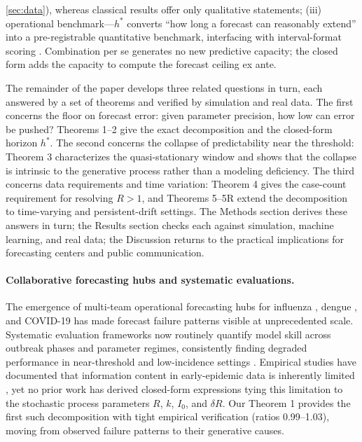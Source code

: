 \documentclass[review]{elsarticle}
\theoremstyle{plain}
\theoremstyle{definition}
\begin{document}
\ref{sec:data}), whereas classical results offer only qualitative statements; (iii) operational benchmark---$h^*$ converts ``how long a forecast can reasonably extend'' into a pre-registrable quantitative benchmark, interfacing with interval-format scoring \citep{bracher2021evaluating}. Combination per se generates no new predictive capacity; the closed form adds the capacity to compute the forecast ceiling ex ante.

The remainder of the paper develops three related questions in turn, each answered by a set of theorems and verified by simulation and real data. The first concerns the floor on forecast error: given parameter precision, how low can error be pushed? Theorems 1--2 give the exact decomposition and the closed-form horizon $h^*$. The second concerns the collapse of predictability near the threshold: Theorem 3 characterizes the quasi-stationary window and shows that the collapse is intrinsic to the generative process rather than a modeling deficiency. The third concerns data requirements and time variation: Theorem 4 gives the case-count requirement for resolving $R>1$, and Theorems 5--5R extend the decomposition to time-varying and persistent-drift settings. The Methods section derives these answers in turn; the Results section checks each against simulation, machine learning, and real data; the Discussion returns to the practical implications for forecasting centers and public communication.

\paragraph{Collaborative forecasting hubs and systematic evaluations.}
The emergence of multi-team operational forecasting hubs for influenza \citep{mcgowan2019collaborative}, dengue \citep{johansson2019open}, and COVID-19 \citep{cramer2022evaluation} has made forecast failure patterns visible at unprecedented scale. Systematic evaluation frameworks \citep{bracher2021evaluating} now routinely quantify model skill across outbreak phases and parameter regimes, consistently finding degraded performance in near-threshold and low-incidence settings \citep{scarpino2019predictability, reich2019collaborative}. Empirical studies have documented that information content in early-epidemic data is inherently limited \citep{farrow2017information, perofsky2017forecasting}, yet no prior work has derived closed-form expressions tying this limitation to the stochastic process parameters $R$, $k$, $I_0$, and $\delta R$. Our Theorem 1 provides the first such decomposition with tight empirical verification (ratios 0.99--1.03), moving from observed failure patterns to their generative causes.
\end{document}
